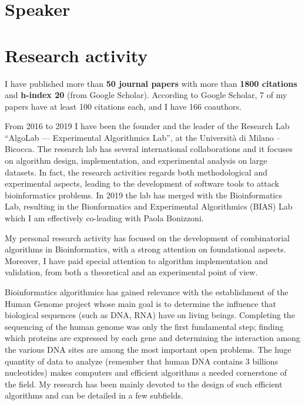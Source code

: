 \documentclass[11pt,a4paper,roman]{moderncv}
\begin{document}
  \section{Speaker}






\section{Research activity}


I have published more than \textbf{50 journal papers} with more than \textbf{1800
citations} and \textbf{h-index 20} (from Google Scholar).
According to Google Scholar, 7 of my papers have at least 100 citations each, and I have 166 coauthors.

From 2016 to 2019 I have been the founder and the leader of the Research Lab
``AlgoLab --- Experimental Algorithmics Lab'', at the Università di Milano -- Bicocca.
The research lab has several international collaborations and it focuses on
algorithm design, implementation, and experimental analysis on large datasets.
In fact, the research activities regards both methodological and experimental
aspects, leading to the development of software tools to attack bioinformatics
problems.
In 2019 the lab has merged with the Bioinformatics Lab, resulting in the
Bionformatics and Experimental Algorithmics (BIAS) Lab which I am effectively
co-leading with Paola Bonizzoni.


My personal research activity has focused on the development of combinatorial
algorithms in Bioinformatics, with a strong attention on foundational aspects.
Moreover, I have paid special attention to algorithm implementation and validation, from both a theoretical and an experimental point of view.


Bioinformatics algorithmics has gained relevance with the establishment of the
Human Genome project whose main goal is to determine the influence that
biological sequences (such as DNA, RNA) have on living beings.
Completing the sequencing of the human genome was only the first
fundamental step; finding which proteins are expressed by each gene and
determining the interaction among the various DNA sites are among the
most important open problems. The huge quantity of data to
analyze (remember that human DNA contains 3 billions nucleotides) makes
computers and efficient algorithms a needed cornerstone of the field.
My research has been mainly devoted to the design of such
efficient algorithms and can be detailed in a few subfields.
\end{document}
